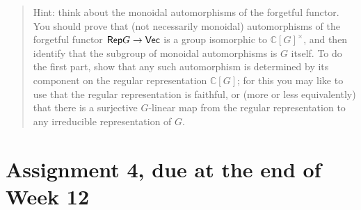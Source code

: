 \documentclass[12pt]{amsart}
\begin{document}
\begin{enumerate}
\begin{itemize}
\begin{quote}
Hint: think about the monoidal automorphisms of the forgetful functor. You should prove that (not necessarily monoidal) automorphisms of the forgetful functor $\mathsf{Rep} G \to \mathsf{Vec}$ is a group isomorphic to $\mathbb C[G]^{\times}$, and then identify that the subgroup of monoidal automorphisms is $G$ itself. To do the first part, show that any such automorphism is determined by its component on the regular representation $\mathbb C[G]$; for this you may like to use that the regular representation is faithful, or (more or less equivalently) that there is a surjective $G$-linear map from the regular representation to any irreducible representation of $G$.
\end{quote}
\end{itemize}
\end{enumerate}


\newpage
\section{Assignment 4, due at the end of Week 12}
\end{document}
